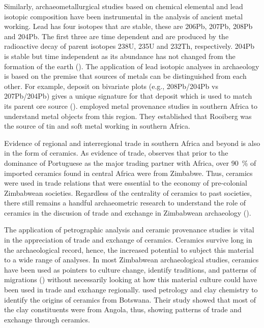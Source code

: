 Similarly, archaeometallurgical studies based on chemical elemental and lead isotopic composition have been instrumental in the analysis of ancient metal working. Lead has four isotopes that are stable, these are 206Pb, 207Pb, 208Pb and 204Pb. The first three are time dependent and are produced by the radioactive decay of parent isotopes 238U, 235U and 232Th, respectively. 204Pb is stable but time independent as its abundance has not changed from the formation of the earth (\cites[][]{molofsky2009}[][]{baron2014}[][]{pernicka2014}). The application of lead isotopic analyses in archaeology is based on the premise that sources of metals can be distinguished from each other. For example, deposit on bivariate plots (e.g., 208Pb/204Pb vs 207Pb/204Pb) gives a unique signature for that deposit which is used to match its parent ore source (\cite[][]{molofsky2009}). \textcite[][]{molofsky2009} employed metal provenance studies in southern Africa to understand metal objects from this region. They established that Rooiberg was the source of tin and soft metal working in southern Africa.

Evidence of regional and interregional trade in southern Africa and beyond is also in the form of ceramics.
As evidence of trade, \textcite[][22]{garlake1968} observes that prior to the dominance of Portuguese as the major trading partner with Africa, over \SI{90}{\percent} of imported ceramics found in central Africa were from Zimbabwe. Thus, ceramics were used in trade relations that were essential to the economy of pre-colonial Zimbabwean societies. Regardless of the centrality of ceramics to past societies, there still remains a handful archaeometric research to understand the role of ceramics in the discusion of trade and exchange in Zimbabwean archaeology  (\cites[][]{lindahl2010}[][]{ashley2015}).

The application of petrographic analysis and ceramic provenance studies is vital in the appreciation of trade and exchange of ceramics. Ceramics survive long in the archaeological record, hence, the increased potential to subject this material to a wide range of analyses. In most Zimbabwean archaeological studies, ceramics have been used as pointers to culture change, identify traditions, and patterns of migrations (\cites[][]{huffman1972}[][]{pikirayi1993}[][]{pikirayi1996}[][]{pwiti1996}) without necessarily looking at how this material culture could have been used in trade and exchange regionally. \textcite[][]{wilmsen2009} used petrology and clay chemistry to identify the origins of ceramics from Botswana. Their study showed that most of the clay constituents were from Angola, thus, showing patterns of trade and exchange through ceramics.

